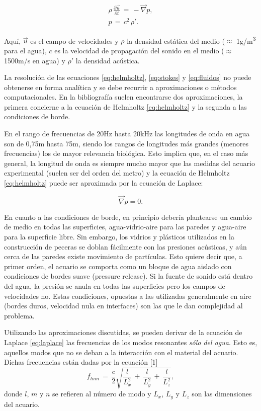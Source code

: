 \begin{align}
	\rho\,\frac{\partial\vec{u}}{\partial t}\,=\,-\vec{\nabla}p,
	\label{eq:stokes}\\
	p\,=\,c^2\,\rho '.
	\label{eq:fluidos}
\end{align}

Aquí, $\vec{u}$ es el campo de velocidades y $\rho$ la densidad estática del medio ($\approx$ 1g/m\textsuperscript{3} para el agua), $c$ es la velocidad de propagación del sonido en el medio ($\approx$ 1500m/s en agua) y $\rho'$ la densidad acústica.

La resolución de las ecuaciones \ref{eq:helmholtz}, \ref{eq:stokes} y \ref{eq:fluidos} no puede obtenerse en forma analítica y se debe recurrir a aproximaciones o métodos computacionales. En la bibliografía suelen encontrarse dos aproximaciones, la primera concierne a la ecuación de Helmholtz \ref{eq:helmholtz} y la segunda a las condiciones de borde.

En el rango de frecuencias de 20Hz hasta 20kHz las longitudes de onda en agua son de 0,75m hasta 75m, siendo los rangos de longitudes más grandes (menores frecuencias) los de mayor relevancia biológica. Esto implica que, en el caso más general, la longitud de onda es siempre mucho mayor que las medidas del acuario experimental (suelen ser del orden del metro) y la ecuación de Helmholtz \ref{eq:helmholtz} puede ser aproximada por la ecuación de Laplace:

\begin{equation}
	\vec{\nabla}p=0.
	\label{eq:laplace}
\end{equation} 

En cuanto a las condiciones de borde, en principio debería plantearse un cambio de medio en todas las superficies, agua-vidrio-aire para las paredes y agua-aire para la superficie libre. Sin embargo, los vidrios y plásticos utilizados en la construcción de peceras se doblan fácilmente con las presiones acústicas, y aún cerca de las paredes existe movimiento de partículas. Esto quiere decir que, a primer orden, el acuario se comporta como un bloque de agua aislado con condiciones de bordes suave (pressure release). Si la fuente de sonido está dentro del agua, la presión se anula en todas las superficies pero los campos de velocidades no. Estas condiciones, opuestas a las utilizadas generalmente en aire (bordes duros, velocidad nula en interfaces) son las que le dan complejidad al problema.

Utilizando las aproximaciones discutidas, se pueden derivar de la ecuación de Laplace \ref{eq:laplace} las frecuencias de los modos resonantes \emph{sólo del agua}. Esto es, aquellos modos que no se deban a la interacción con el material del acuario. Dichas frecuencias están dadas por la ecuación [1]
\begin{equation}
	f_{lmn}\,=\,\frac{c}{2}\sqrt{\frac{l}{L^2_x}\,+\,\frac{l}{L^2_y}\,+\,\frac{l}{L^2_z}},
	\label{eq:resonancias}
\end{equation}
donde $l$, $m$ y $n$ se refieren al número de modo y $L_x$, $L_y$ y $L_z$ son las dimensiones del acuario.

